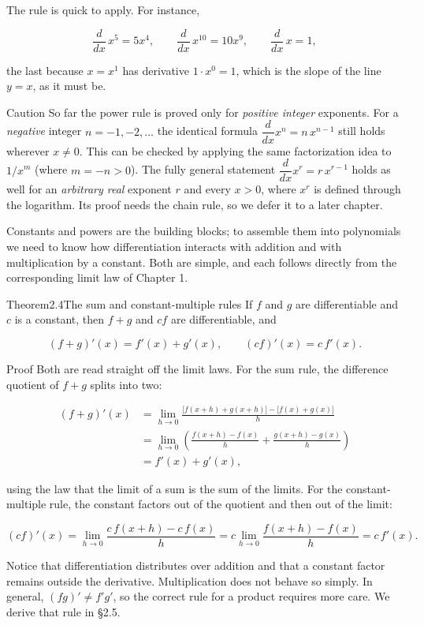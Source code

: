 \documentclass[a4paper,12pt,oneside]{memoir}
\begin{document}
The rule is quick to apply. For instance,

\[ \frac{d}{dx}\,x^{5} = 5x^{4}, \qquad \frac{d}{dx}\,x^{10} = 10x^{9}, \qquad \frac{d}{dx}\,x = 1, \]

the last because \(x = x^{1}\) has derivative \(1 \cdot x^{0} = 1\), which is the slope of the line \(y = x\), as it must be.

\begin{envcaution}{Caution}{}{}
So far the power rule is proved only for \emph{positive integer} exponents. For a \emph{negative} integer \(n = -1, -2, \ldots\) the identical formula \(\dfrac{d}{dx}x^{n} = n\,x^{n-1}\) still holds wherever \(x \ne 0\). This can be checked by applying the same factorization idea to \(1/x^{m}\) (where \(m = -n > 0\)). The fully general statement \(\dfrac{d}{dx}x^{r} = r\,x^{r-1}\) holds as well for an \emph{arbitrary real} exponent \(r\) and every \(x > 0\), where \(x^{r}\) is defined through the logarithm. Its proof needs the chain rule, so we defer it to a later chapter.
\end{envcaution}
Constants and powers are the building blocks; to assemble them into polynomials we need to know how differentiation interacts with addition and with multiplication by a constant. Both are simple, and each follows directly from the corresponding limit law of Chapter 1.

\begin{envtheorem}{Theorem}{2.4}{The sum and constant-multiple rules}
If \(f\) and \(g\) are differentiable and \(c\) is a constant, then \(f + g\) and \(cf\) are differentiable, and

\[ (f + g)'(x) = f'(x) + g'(x), \qquad (cf)'(x) = c\,f'(x). \]
\end{envtheorem}
\begin{envproof}{Proof}{}{}
Both are read straight off the limit laws. For the sum rule, the difference quotient of \(f + g\) splits into two:

\[ \begin{aligned}
        (f + g)'(x) &= \lim_{h \to 0} \frac{\bigl[f(x+h) + g(x+h)\bigr] - \bigl[f(x) + g(x)\bigr]}{h} \\[2pt]
        &= \lim_{h \to 0} \left( \frac{f(x+h) - f(x)}{h} + \frac{g(x+h) - g(x)}{h} \right) \\[2pt]
        &= f'(x) + g'(x),
      \end{aligned} \]

using the law that the limit of a sum is the sum of the limits. For the constant-multiple rule, the constant factors out of the quotient and then out of the limit:

\[ (cf)'(x) = \lim_{h \to 0} \frac{c\,f(x+h) - c\,f(x)}{h} = c \lim_{h \to 0} \frac{f(x+h) - f(x)}{h} = c\,f'(x). \]
\end{envproof}
Notice that differentiation distributes over addition and that a constant factor remains outside the derivative. Multiplication does not behave so simply. In general, \((fg)' \ne f'g'\), so the correct rule for a product requires more care. We derive that rule in §2.5.
\end{document}
